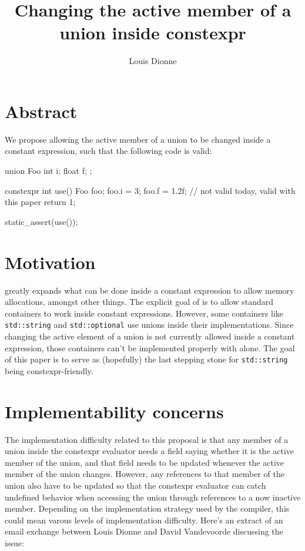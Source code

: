 \documentclass{wg21}
\title{Changing the active member of a union inside constexpr}
\author{Louis Dionne}{ldionne@apple.com}
\newcommand{\cc}[1]{\texttt{#1}}
\begin{document}
\maketitle

\section{Abstract}
We propose allowing the active member of a union to be changed inside a
constant expression, such that the following code is valid:

\begin{cpp}
union Foo {
  int i;
  float f;
};

constexpr int use() {
  Foo foo{};
  foo.i = 3;
  foo.f = 1.2f; // not valid today, valid with this paper
  return 1;
}

static_assert(use());
\end{cpp}


\section{Motivation}
\cite{P0784} greatly expands what can be done inside a constant expression to
allow memory allocations, amongst other things. The explicit goal of \cite{P0784}
is to allow standard containers to work inside constant expressions. However,
some containers like \cc{std::string} and \cc{std::optional} use unions inside
their implementations. Since changing the active element of a union is not
currently allowed inside a constant expression, those containers can't be
implemented properly with \cite{P0784} alone. The goal of this paper is to
serve as (hopefully) the last stepping stone for \cc{std::string} being
constexpr-friendly.


\section{Implementability concerns}
The implementation difficulty related to this proposal is that any member of a
union inside the constexpr evaluator needs a field saying whether it is the
active member of the union, and that field needs to be updated whenever the
active member of the union changes. However, any references to that member
of the union also have to be updated so that the constexpr evaluator can
catch undefined behavior when accessing the union through references to a
now inactive member. Depending on the implementation strategy used by the
compiler, this could mean varous levels of implementation difficulty. Here's
an extract of an email exchange between Louis Dionne and David Vandevoorde
discussing the issue:
\end{document}
